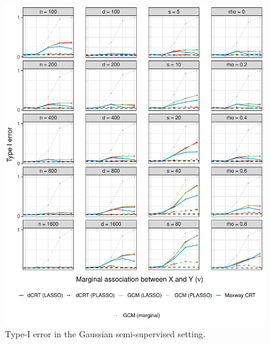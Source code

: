 \documentclass[12pt]{article}
\theoremstyle{definition}
\theoremstyle{remark}
\begin{document}
\begin{figure}[!ht]
	\centering
	\includegraphics[scale = 1]{figures/gaussian_semi_supervised_setting_null.pdf}
	\caption{Type-I error in the Gaussian semi-supervised setting.}
	\label{fig:gaussian_semi-supervised_null}
\end{figure}
\end{document}
